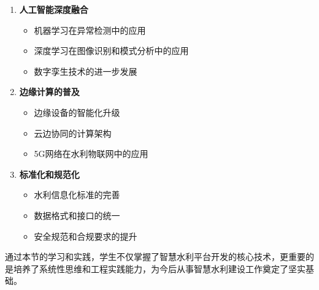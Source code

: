 \begin{enumerate}
\def\labelenumi{\arabic{enumi}.}
\tightlist
\item
  \textbf{人工智能深度融合}

  \begin{itemize}
  \tightlist
  \item
    机器学习在异常检测中的应用
  \item
    深度学习在图像识别和模式分析中的应用
  \item
    数字孪生技术的进一步发展
  \end{itemize}
\item
  \textbf{边缘计算的普及}

  \begin{itemize}
  \tightlist
  \item
    边缘设备的智能化升级
  \item
    云边协同的计算架构
  \item
    5G网络在水利物联网中的应用
  \end{itemize}
\item
  \textbf{标准化和规范化}

  \begin{itemize}
  \tightlist
  \item
    水利信息化标准的完善
  \item
    数据格式和接口的统一
  \item
    安全规范和合规要求的提升
  \end{itemize}
\end{enumerate}

通过本节的学习和实践，学生不仅掌握了智慧水利平台开发的核心技术，更重要的是培养了系统性思维和工程实践能力，为今后从事智慧水利建设工作奠定了坚实基础。
